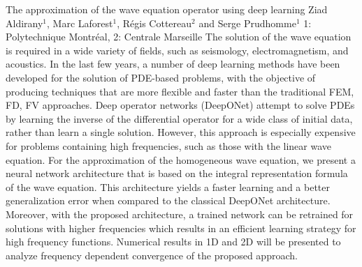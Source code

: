 \begin{addmargin}[2em]{0em}
\vspace{1.5ex}
\abs
{The approximation of the wave equation operator using deep learning }
{Ziad Aldirany$^{1}$, Marc Laforest$^{1}$, Régis Cottereau$^{2}$ and Serge
Prudhomme$^{1}$}
{1: Polytechnique Montréal, 2: Centrale Marseille}
{The solution of the wave equation is required in a wide variety of
fields, such as seismology, electromagnetism, and acoustics. In the
last few years, a number of deep learning methods have been developed for the solution
of PDE-based problems, with the objective of producing techniques that
are more flexible and faster than the traditional FEM, FD, FV
approaches. Deep operator networks (DeepONet) attempt to solve PDEs by
learning the inverse of the differential operator for a wide class of
initial data, rather than learn a single solution. However, this
approach is especially expensive for problems containing high
frequencies, such as those with the linear wave equation.
For the approximation of the homogeneous wave equation, we present a
neural network architecture that is based on the integral
representation formula of the wave equation.
This architecture yields a faster learning and a better generalization
error when compared to the classical DeepONet architecture. Moreover,
with the proposed architecture, a trained network can be retrained for
solutions with higher frequencies which results in an efficient
learning strategy for high frequency functions.
Numerical results in 1D and 2D will be presented to analyze frequency
dependent convergence of the proposed approach. }



\end{addmargin}
